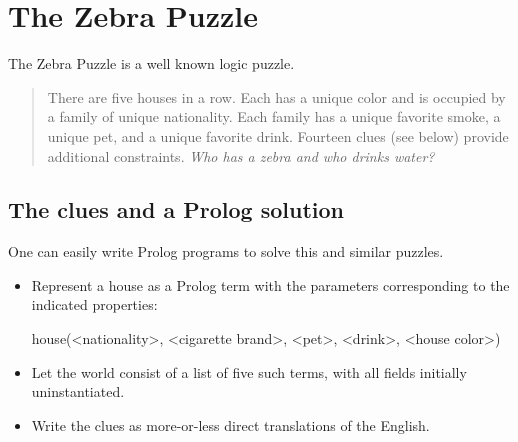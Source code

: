 \section{The Zebra Puzzle}\label{sec:zebra}

The Zebra Puzzle is a well known logic puzzle.

\begin{quotation}
There are five houses in a row. Each has a unique color and is occupied by a family of unique nationality. Each family has a unique favorite smoke, a unique pet, and a unique favorite drink. Fourteen clues (see below) provide additional constraints. \textit{Who has a zebra and who drinks water?}
\end{quotation}

\subsection{The clues and a Prolog solution}

One can easily write Prolog programs to solve this and similar puzzles.
\begin{itemize}
\item Represent a house as a Prolog  term with the parameters corresponding to the indicated properties:
\begin{python}
   house(<nationality>, <cigarette brand>, <pet>, <drink>, <house color>)
\end{python}
\item Let the world consist of a list of five such  terms, with all fields initially uninstantiated.

\item Write the clues as more-or-less direct translations of the English.
\end{itemize}

